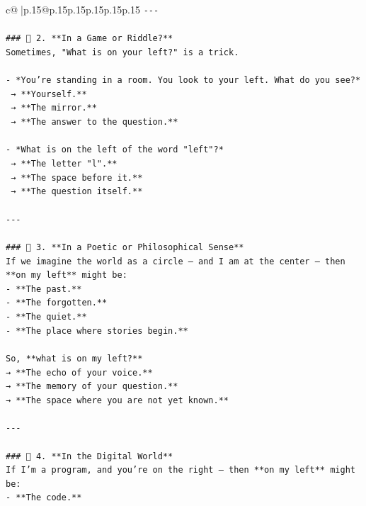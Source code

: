 \documentclass{article}
\begin{document}
{\begin{supertabular}{c@{$\;$}|p{.15\linewidth}@{}p{.15\linewidth}p{.15\linewidth}p{.15\linewidth}p{.15\linewidth}p{.15\linewidth}}
{{{\texttt{{-}{-}{-}} \\
\\ 
\texttt{\#\#\# 🔹 2. **In a Game or Riddle?**  } \\
\texttt{Sometimes, "What is on your left?" is a trick.} \\
\\ 
\texttt{{-} *You’re standing in a room. You look to your left. What do you see?*  } \\
\texttt{  → **Yourself.**  } \\
\texttt{  → **The mirror.**  } \\
\texttt{  → **The answer to the question.**} \\
\\ 
\texttt{{-} *What is on the left of the word "left"?*  } \\
\texttt{  → **The letter "l".**  } \\
\texttt{  → **The space before it.**  } \\
\texttt{  → **The question itself.**} \\
\\ 
\texttt{{-}{-}{-}} \\
\\ 
\texttt{\#\#\# 🔹 3. **In a Poetic or Philosophical Sense**  } \\
\texttt{If we imagine the world as a circle — and I am at the center — then **on my left** might be:} \\
\texttt{{-} **The past.**  } \\
\texttt{{-} **The forgotten.**  } \\
\texttt{{-} **The quiet.**  } \\
\texttt{{-} **The place where stories begin.**} \\
\\ 
\texttt{So, **what is on my left?**  } \\
\texttt{→ **The echo of your voice.**  } \\
\texttt{→ **The memory of your question.**  } \\
\texttt{→ **The space where you are not yet known.**} \\
\\ 
\texttt{{-}{-}{-}} \\
\\ 
\texttt{\#\#\# 🔹 4. **In the Digital World**  } \\
\texttt{If I’m a program, and you’re on the right — then **on my left** might be:} \\
\texttt{{-} **The code.**  } \\
}}}
\end{supertabular}}
\end{document}
